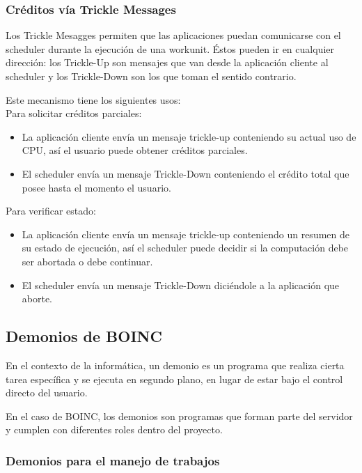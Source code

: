 \subsubsection{Créditos vía Trickle Messages}

Los Trickle Mesagges permiten que las aplicaciones puedan comunicarse con el scheduler durante la ejecución de una workunit. Éstos pueden ir en cualquier dirección: los Trickle-Up son mensajes que van desde la aplicación cliente al scheduler y los Trickle-Down son los que toman el sentido contrario.

Este mecanismo tiene los siguientes usos:\\

Para solicitar créditos parciales:
\begin{itemize}
\item La aplicación cliente envía un mensaje trickle-up conteniendo su actual uso de CPU, así el usuario puede obtener créditos parciales.
\item El scheduler envía un mensaje Trickle-Down conteniendo el crédito total que posee hasta el momento el usuario.
\end{itemize}

Para verificar estado:

\begin{itemize}
\item La aplicación cliente envía un mensaje trickle-up conteniendo un resumen de su estado de ejecución, así el scheduler puede decidir si la computación debe ser abortada o debe continuar.
\item El scheduler envía un mensaje Trickle-Down diciéndole a la aplicación que aborte.
\end{itemize}

\subsection{Demonios de BOINC}

En el contexto de la informática, un demonio es un programa que realiza cierta tarea específica y se ejecuta en segundo plano, en lugar de estar bajo el control directo del usuario. 

En el caso de BOINC, los demonios son programas que forman parte del servidor y cumplen con diferentes roles dentro del proyecto.

\subsubsection{Demonios para el manejo de trabajos}

